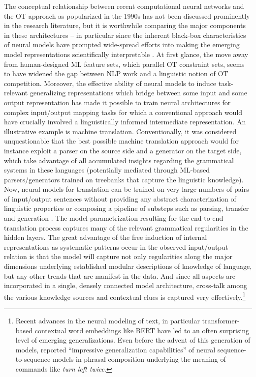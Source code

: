 \documentclass[output=paper,hidelinks]{langscibook}
\begin{document}
The conceptual relationship between recent computational neural networks and the OT approach as popularized in the 1990s has not been discussed prominently in the research literature, but it is worthwhile comparing the major components in these architectures -- in particular since the inherent black-box characteristics of neural models have prompted wide-spread efforts into making the emerging model representations scientifically interpretable \citep[see, e.g.,][]{BelinkovGlass2019}. %
At first glance, the move away from human-designed ML feature sets, which parallel OT constraint sets, seems to have widened the gap between NLP work and a linguistic notion of OT competition. 
Moreover, the effective ability of neural models to induce task-relevant generalizing representations which bridge between some input and some output representation has made it possible to train neural architectures for complex input/output mapping tasks for which a conventional approach would have crucially involved a linguistically informed intermediate representation. An illustrative example is machine translation. Conventionally, it was considered unquestionable that the best possible machine translation approach would for instance exploit a parser on the source side and a generator on the target side, which take advantage of all accumulated insights regarding the grammatical systems in these languages (potentially mediated through ML-based parsers/generators trained on treebanks that capture the linguistic knowledge). Now, neural models for translation can be trained on very large numbers of pairs of input/output sentences without providing any abstract characterization of linguistic properties or composing a pipeline of substeps such as parsing, transfer and generation \citep[for an overview, see][]{ZhangZong}. The model parametrization resulting for the end-to-end translation process captures many of the relevant grammatical regularities in the hidden layers. The great advantage of the free induction of internal representations as systematic patterns occur in the observed input/output relation is that the model will capture not only regularities along the major dimensions underlying established modular descriptions of knowledge of language, but any other trends that are manifest in the data. And since all aspects are incorporated in a single, densely connected model architecture, cross-talk among the various knowledge sources and contextual clues is captured very effectively.\footnote{Recent advances in the neural modeling of text, in particular transformer-based contextual word embeddings like BERT \citep{devlin-etal-2019-bert} have led to an often surprising level of emerging generalizations. Even before the advent of this generation of models, \citet{Loula-etal-2018} reported ``impressive  generalization capabilities'' of neural sequence-to-sequence models in phrasal composition underlying the meaning of commands like \emph{turn left twice}. }
\end{document}
